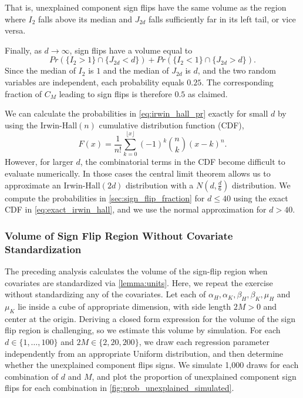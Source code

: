 That is, unexplained component sign flips have the same volume as the region where \( I_2 \) falls above its median and \( J_{2d} \) falls sufficiently far in its left tail, or vice versa.

Finally, as \( d \to \infty \), sign flips have a volume equal to
\begin{equation}
\label{eq:irwin_hall_pr}
 Pr \left( \{ I_2 > 1 \} \cap \{ J_{2d} < d \}  \right) +
    Pr \left( \{ I_2 < 1 \} \cap \{ J_{2d} > d \} \right).
\end{equation}
Since the median of \( I_2 \) is $1$ and the median of \( J_{2d} \) is $d$, and the two random variables are independent, each probability equals \( 0.25 \).
The corresponding fraction of $C_M$ leading to sign flips is therefore \( 0.5 \) as claimed.

\begin{remark} \label{remark:computing_irwin_hall}
We can calculate the probabilities in \cref{eq:irwin_hall_pr} exactly for small \( d \) by using the Irwin-Hall$(n)$ cumulative distribution function (CDF),
\begin{equation}
F(x) = \frac{1}{n!} \sum_{k=0}^{\lfloor x \rfloor} (-1)^k \binom{n}{k} (x - k)^n. \label{eq:exact_irwin_hall}
\end{equation}
However, for larger \( d \), the combinatorial terms in the CDF become difficult to evaluate numerically.
In those cases the central limit theorem allows us to approximate an Irwin-Hall$(2d)$ distribution with a \( N(d, \frac{d}{6})\) distribution.
We compute the probabilities in \cref{sec:sign_flip_fraction} for $d \leq 40$ using the exact CDF in \cref{eq:exact_irwin_hall}, and we use the normal approximation for $d > 40$.
\end{remark}

\subsubsection{Volume of Sign Flip Region Without Covariate Standardization}
\label{appendix:sign_flip_simulation}
The preceding analysis calculates the volume of the sign-flip region when covariates are standardized via \cref{lemma:units}.
Here, we repeat the exercise without standardizing any of the covariates.
Let each of \( \alpha_H, \alpha_K, \beta_H, \beta_K, \mu_H \) and \( \mu_K \) lie inside a cube of appropriate dimension, with side length \( 2M > 0 \) and center at the origin.
Deriving a closed form expression for the volume of the sign flip region is challenging, so we estimate this volume by simulation.
For each \( d \in \{1, \dots, 100 \} \) and \( 2M \in \{2, 20, 200\} \), we draw each regression parameter independently from an appropriate Uniform distribution, and then determine whether the unexplained component flips signs.
We simulate 1,000 draws for each combination of \( d \) and \( M \), and plot the proportion of unexplained component sign flips for each combination in \cref{fig:prob_unexplained_simulated}.

